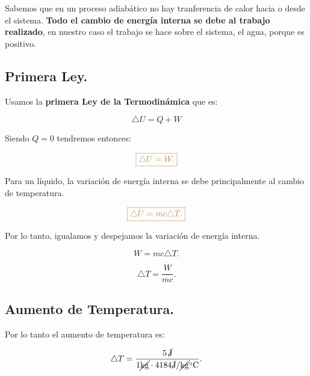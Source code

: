 \documentclass[a4paper,12pt]{article} %
\begin{document}
\begin{justify}
	Sabemos que en un proceso adiabático no hay tranferencia de calor hacia o desde el sistema.\textbf{ Todo el cambio de energía interna se debe al trabajo realizado}, en nuestro caso el trabajo se hace sobre el sistema, el agua, porque es positivo. 
\end{justify}


\subsection{Primera Ley.}

\begin{justify}
	Usamos la \textbf{primera Ley de la Termodinámica} que es:
\end{justify}

\[ \triangle U = Q + W \]

\begin{justify}
	Siendo \( Q = 0 \)  tendremos entonces:
\end{justify}

\[ \textcolor{brown}{\boxed{ \triangle U = W.}} \]

\begin{justify}
	Para un líquido, la variación de energía interna se debe principalmente al cambio de temperatura.
\end{justify}

\[ \textcolor{brown}{\boxed{ \triangle U = mc \triangle T.}} \]

\begin{justify}
	Por lo tanto, igualamos y despejamos la variación de energía interna.
\end{justify}

\[ W = mc \triangle T. \]

\[ \triangle T = \frac{W}{mc}. \]

\subsection{Aumento de Temperatura.}

\begin{justify}
	Por lo tanto el aumento de temperatura es:
\end{justify}

\[ \triangle T = \frac{5 \, \cancel{\mathrm{J}}}{ 1 \cancel{\mathrm{kg}} \cdot 4184 \cancel{\mathrm{J}} / \cancel{\mathrm{kg}} \SI{}{\degreeCelsius}}. \]

\vspace{\baselineskip}
\end{document}
